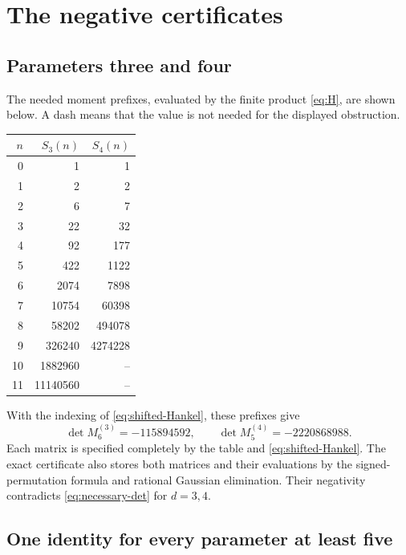 \documentclass[11pt]{article}
\begin{document}
\section{The negative certificates}

\subsection{Parameters three and four}

The needed moment prefixes, evaluated by the finite product
\eqref{eq:H}, are shown below. A dash means that the value is not
needed for the displayed obstruction.
\begin{center}\small
\begin{tabular}{r|r|r}
$n$&$S_3(n)$&$S_4(n)$\\\hline
0&1&1\\
1&2&2\\
2&6&7\\
3&22&32\\
4&92&177\\
5&422&1122\\
6&2074&7898\\
7&10754&60398\\
8&58202&494078\\
9&326240&4274228\\
10&1882960&--\\
11&11140560&--
\end{tabular}
\end{center}
With the indexing of \eqref{eq:shifted-Hankel}, these prefixes give
\begin{equation}\label{eq:small-negative}
 \det M_6^{(3)}=-115894592,
 \qquad \det M_5^{(4)}=-2220868988.
\end{equation}
Each matrix is specified completely by the table and
\eqref{eq:shifted-Hankel}. The exact certificate also stores both
matrices and their evaluations by the signed-permutation formula
and rational Gaussian elimination. Their negativity contradicts
\eqref{eq:necessary-det} for $d=3,4$.

\subsection{One identity for every parameter at least five}
\end{document}
